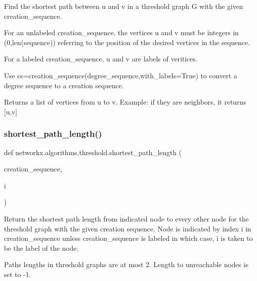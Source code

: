 \begin{DoxyVerb}Find the shortest path between u and v in a
threshold graph G with the given creation_sequence.

For an unlabeled creation_sequence, the vertices
u and v must be integers in (0,len(sequence)) referring
to the position of the desired vertices in the sequence.

For a labeled creation_sequence, u and v are labels of veritices.

Use cs=creation_sequence(degree_sequence,with_labels=True)
to convert a degree sequence to a creation sequence.

Returns a list of vertices from u to v.
Example: if they are neighbors, it returns [u,v]
\end{DoxyVerb}
 \mbox{\label{namespacenetworkx_1_1algorithms_1_1threshold_aa2cb236bd0510a01652eee2affafa733}} 
\subsubsection{\texorpdfstring{shortest\+\_\+path\+\_\+length()}{shortest\_path\_length()}}
{\footnotesize\ttfamily def networkx.\+algorithms.\+threshold.\+shortest\+\_\+path\+\_\+length (\begin{DoxyParamCaption}\item[{}]{creation\+\_\+sequence,  }\item[{}]{i }\end{DoxyParamCaption})}

\begin{DoxyVerb}Return the shortest path length from indicated node to
every other node for the threshold graph with the given
creation sequence.
Node is indicated by index i in creation_sequence unless
creation_sequence is labeled in which case, i is taken to
be the label of the node.

Paths lengths in threshold graphs are at most 2.
Length to unreachable nodes is set to -1.
\end{DoxyVerb}
 \mbox{\label{namespacenetworkx_1_1algorithms_1_1threshold_a19415f0520a02f2ca7b565aba31355d9}} 

